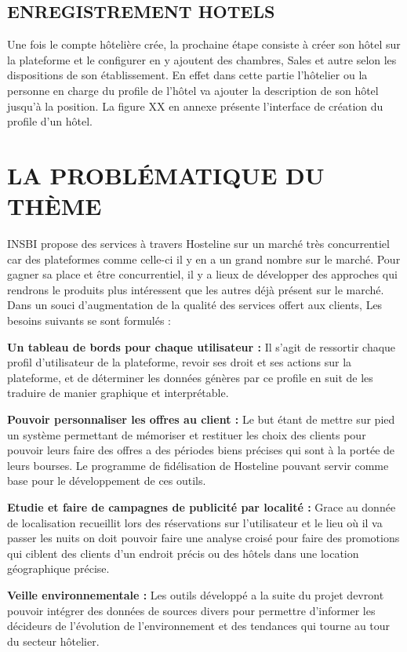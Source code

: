 \subsection{ENREGISTREMENT HOTELS}
Une fois le compte hôtelière crée, la prochaine étape consiste à créer son hôtel sur la plateforme et le configurer en y ajoutent des chambres, Sales et autre selon les dispositions de son établissement. En effet dans cette partie l’hôtelier ou la personne en charge du profile de l’hôtel va ajouter la description de son hôtel jusqu’à la position. La figure XX en annexe présente l’interface de création du profile d’un hôtel. 

\cleardoublepage
\section{LA PROBLÉMATIQUE DU THÈME}

INSBI propose des services à travers Hosteline sur un marché très concurrentiel car des plateformes comme celle-ci il y en a un grand nombre sur le marché. Pour gagner sa place et être concurrentiel, il y a lieux de développer des approches qui rendrons le produits plus intéressent que les autres déjà présent sur le marché. Dans un souci d’augmentation de la qualité des services offert aux clients, Les besoins suivants se sont formulés :
\begin{list}{•}{ }
\item\textbf{ Un tableau de bords pour chaque utilisateur :} Il s’agit de ressortir chaque profil d’utilisateur de la plateforme, revoir ses droit et ses actions sur la plateforme, et de déterminer les données génères par ce profile en suit de les traduire de manier graphique et interprétable. \\

\item\textbf{Pouvoir personnaliser les offres au client :} Le but étant de mettre sur pied un système permettant de mémoriser et restituer les choix des clients pour pouvoir leurs faire des offres a des périodes biens précises qui sont à la portée de leurs bourses. Le programme de fidélisation de Hosteline pouvant servir comme base pour le développement de ces outils. \\

\item\textbf{Etudie et faire de campagnes de publicité par localité :} Grace au donnée de localisation recueillit lors des réservations sur l’utilisateur et le lieu où il va passer les nuits on doit pouvoir faire une analyse croisé pour faire des promotions qui ciblent des clients d’un endroit précis ou des hôtels dans une location géographique précise.\\

\item\textbf{Veille environnementale :} Les outils développé a la suite du projet devront pouvoir intégrer des données de sources divers pour permettre d’informer les décideurs de l’évolution de l’environnement et des tendances qui tourne au tour du secteur hôtelier.\\
\end{list}

